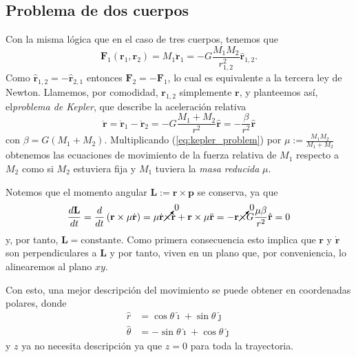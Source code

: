 \subsection{Problema de dos cuerpos}
Con la misma lógica que en el caso de tres cuerpos, tenemos que 
\begin{equation}
 \mathbf{F}_1(\mathbf{r}_1,\mathbf{r}_2) = M_1 \ddot{\mathbf{r}}_1 = -G \frac{M_1 M_2}{r_{1,2}^2} \hat{\mathbf{r}}_{1,2}.
 \label{eq:2body_eqs_motion}
\end{equation}
Como $\hat{\mathbf{r}}_{1,2} = - \hat{\mathbf{r}}_{2,1}$ entonces $\mathbf{F}_2 = -\mathbf{F}_1$, lo cual es equivalente a la tercera ley de Newton. Llamemos, por comodidad, $\mathbf{r}_{1,2}$ simplemente $\mathbf{r}$, y planteemos así, el\textit{problema de Kepler}, que describe la aceleración relativa
\begin{equation}
 \ddot{\mathbf{r}} = \ddot{\mathbf{r}}_1 - \ddot{\mathbf{r}}_2 = -G \frac{M_1 + M_2}{r^2} \hat{\mathbf{r}} = - \frac{\beta}{r^2}\hat{\mathbf{r}}
 \label{eq:kepler_problem}
\end{equation}
con $\beta = G \left(M_1 + M_2 \right)$. Multiplicando (\ref{eq:kepler_problem}) por $\mu := \frac{M_1 M_2}{M_1+M_2}$ obtenemos las ecuaciones de movimiento de la fuerza relativa de $M_1$ respecto a $M_2$ como si $M_2$ estuviera fija y $M_1$ tuviera la \textit{masa reducida} $\mu$.

Notemos que el momento angular $\mathbf{L} := \mathbf{r} \times \mathbf{p}$ se conserva, ya que
\begin{equation}
 \frac{d\mathbf{L}}{dt} = \frac{d}{dt}\left(\mathbf{r} \times \mu\dot{\mathbf{r}} \right) = \mu\dot{\mathbf{r}} \cancelto{0}{\times}\dot{\mathbf{r}} + \mathbf{r} \times \mu \ddot{\mathbf{r}} = - \mathbf{r} \cancelto{0}{\times} G\frac{\mu \beta}{r^2}\hat{\mathbf{r}} = 0
\end{equation}
y, por tanto, $\mathbf{L} = \text{constante}$. Como primera consecuencia esto implica que $\mathbf{r}$ y $\dot{\mathbf{r}}$ son perpendiculares a $\mathbf{L}$ y por tanto, viven en un plano que, por conveniencia, lo alinearemos al plano $xy$. 

Con esto, una mejor descripción del movimiento se puede obtener en coordenadas polares, donde
\begin{align}
 \hat{r} &= \cos \theta \hat{\imath} + \sin \theta \hat{\jmath} \nonumber \\
 \hat{\theta} &= -\sin \theta \hat{\imath} + \cos \theta \hat{\jmath}
 \label{eq:polar_transformation}
\end{align}
y $z$ ya no necesita descripción ya que $z=0$ para toda la trayectoria. 

